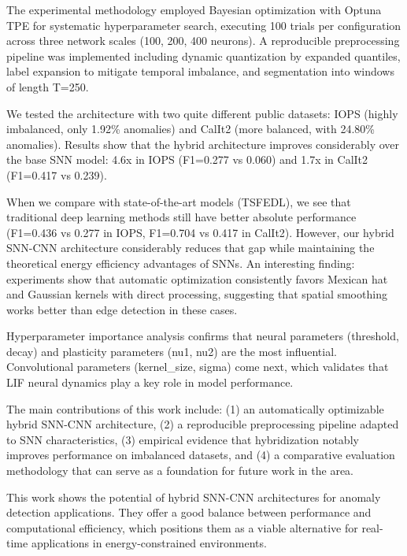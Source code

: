 The experimental methodology employed Bayesian optimization with Optuna TPE for systematic hyperparameter search, executing 100 trials per configuration across three network scales (100, 200, 400 neurons). A reproducible preprocessing pipeline was implemented including dynamic quantization by expanded quantiles, label expansion to mitigate temporal imbalance, and segmentation into windows of length T=250.

We tested the architecture with two quite different public datasets: IOPS (highly imbalanced, only 1.92\% anomalies) and CalIt2 (more balanced, with 24.80\% anomalies). Results show that the hybrid architecture improves considerably over the base SNN model: 4.6x in IOPS (F1=0.277 vs 0.060) and 1.7x in CalIt2 (F1=0.417 vs 0.239).

When we compare with state-of-the-art models (TSFEDL), we see that traditional deep learning methods still have better absolute performance (F1=0.436 vs 0.277 in IOPS, F1=0.704 vs 0.417 in CalIt2). However, our hybrid SNN-CNN architecture considerably reduces that gap while maintaining the theoretical energy efficiency advantages of SNNs. An interesting finding: experiments show that automatic optimization consistently favors Mexican hat and Gaussian kernels with direct processing, suggesting that spatial smoothing works better than edge detection in these cases.

Hyperparameter importance analysis confirms that neural parameters (threshold, decay) and plasticity parameters (nu1, nu2) are the most influential. Convolutional parameters (kernel\_size, sigma) come next, which validates that LIF neural dynamics play a key role in model performance.

The main contributions of this work include: (1) an automatically optimizable hybrid SNN-CNN architecture, (2) a reproducible preprocessing pipeline adapted to SNN characteristics, (3) empirical evidence that hybridization notably improves performance on imbalanced datasets, and (4) a comparative evaluation methodology that can serve as a foundation for future work in the area.

This work shows the potential of hybrid SNN-CNN architectures for anomaly detection applications. They offer a good balance between performance and computational efficiency, which positions them as a viable alternative for real-time applications in energy-constrained environments.